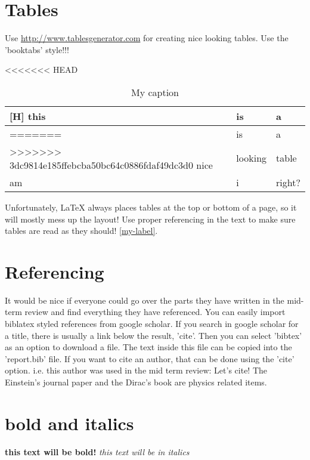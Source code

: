 \section{Tables}
Use \url{http://www.tablesgenerator.com} for creating nice looking tables. Use the 'booktabs' style!!!
\begin{table}[H]
\centering
\caption{My caption}
\label{my-label}
<<<<<<< HEAD
\begin{tabular}{lll}[H]
\hline
this & is      & a      \\ \hline
=======
\begin{tabular}{@{}lll@{}}
\toprule
this & is      & a      \\ \midrule
>>>>>>> 3dc9814e185ffebcba50bc64c0886fdaf49dc3d0
nice & looking & table  \\
am   & i       & right? \\ \bottomrule
\end{tabular}
\end{table}
Unfortunately, LaTeX always places tables at the top or bottom of a page, so it will mostly mess up the layout! Use proper referencing in the text to make sure tables are read as they should! \autoref{my-label}.

\section{Referencing}
It would be nice if everyone could go over the parts they have written in the mid-term review and find everything they have referenced. You can easily import biblatex styled references from google scholar. If you search in google scholar for a title, there is usually a link below the result, 'cite'. Then you can select 'bibtex' as an option to download a file. The text inside this file can be copied into the 'report.bib' file. If you want to cite an author, that can be done using the 'cite' option. i.e. this author was used in the mid term review:
Let's cite! The Einstein's journal paper \cite{mautz2012indoor} and the Dirac's 
book \cite{meneses2012large} are physics related items. 

\section{bold and italics}
\textbf{this text will be bold!}
\textit{this text will be in italics}




